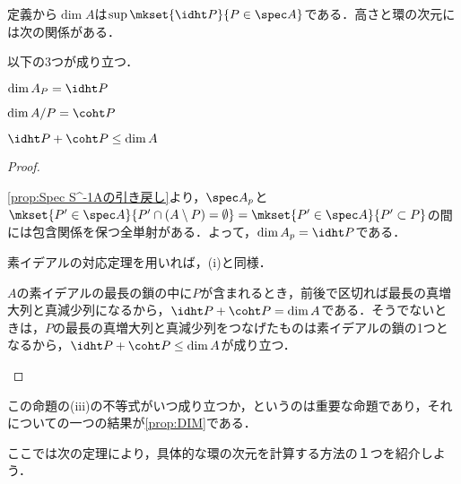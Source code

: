 定義から$\dim A$は$\sup\mkset{\idht P}{P\in\spec A}$である．高さと環の次元には次の関係がある．
	
\begin{prop}\label{prop:htとcohtの定義}
	以下の3つが成り立つ．
	\begin{sakura}
		\item $\dim A_P=\idht P$
		\item $\dim A/P=\coht P$
		\item $\idht P+\coht P\leq\dim A$
	\end{sakura}
\end{prop}

\begin{proof}
	\begin{sakura}
		\item 
			\ref{prop:Spec S^-1Aの引き戻し}より，$\spec A_p$と$\mkset{ P '\in\spec A}{ P '\cap (A\setminus P )=\emptyset}=\mkset{ P '\in\spec A}{ P '\subset P }$の間には包含関係を保つ全単射がある．よって，$\dim A_p=\idht P $である．
		\item 
			素イデアルの対応定理を用いれば，(i)と同様．
		\item 
			$A$の素イデアルの最長の鎖の中に$ P $が含まれるとき，前後で区切れば最長の真増大列と真減少列になるから，$\idht P +\coht P =\dim A$である．そうでないときは，$ P $の最長の真増大列と真減少列をつなげたものは素イデアルの鎖の1つとなるから，$\idht P +\coht P \leq\dim A$が成り立つ．
	\end{sakura}
\end{proof}
	
この命題の(iii)の不等式がいつ成り立つか，というのは重要な命題であり，それについての一つの結果が\ref{prop:DIM}である．

ここでは次の定理により，具体的な環の次元を計算する方法の１つを紹介しよう．

